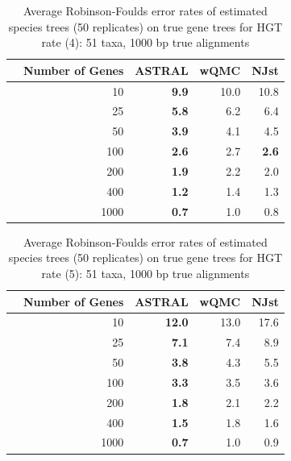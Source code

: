 \begin{table}[h!]
\caption[Error rates of estimated species trees (50 replicates)  on true gene trees for HGT rate 4]{Average Robinson-Foulds error rates of estimated species trees (50 replicates)  on true gene trees for HGT rate (4): 51 taxa, 1000 bp true alignments}
\begin{tabular}{rrrrr}
 & Number of Genes & ASTRAL & wQMC  & NJst\\
\hline
 & 10 & \textbf{9.9} & 10.0   & 10.8\\
 & 25 & \textbf{5.8} & 6.2  & 6.4\\
 & 50 & \textbf{3.9} & 4.1   & 4.5\\
 & 100 & \textbf{2.6} & 2.7   & \textbf{2.6} \\
 & 200 & \textbf{1.9} & 2.2   & 2.0\\
 & 400 & \textbf{1.2} & 1.4   & 1.3\\
 & 1000 & \textbf{0.7} & 1.0   & 0.8\\
\end{tabular}
\label{hgt::table10}
\end{table}

\begin{table}[h!]
\caption[Error rates of estimated species trees (50 replicates)  on true gene trees for HGT rate 5]{Average Robinson-Foulds error rates of estimated species trees (50 replicates) 
on true gene trees for HGT rate (5): 51 taxa, 1000 bp true alignments}
\begin{tabular}{rrrrr}
 & Number of Genes & ASTRAL & wQMC  & NJst\\
\hline
 & 10 & \textbf{12.0} & 13.0   & 17.6\\
 & 25 & \textbf{7.1} & 7.4  & 8.9\\
 & 50 & \textbf{3.8} & 4.3   & 5.5\\
 & 100 & \textbf{3.3} & 3.5   & 3.6\\
 & 200 & \textbf{1.8} & 2.1   & 2.2\\
 & 400 & \textbf{1.5} & 1.8  & 1.6\\
 & 1000 & \textbf{0.7}& 1.0   & 0.9\\
\end{tabular}
\label{hgt::table11}
\end{table}



